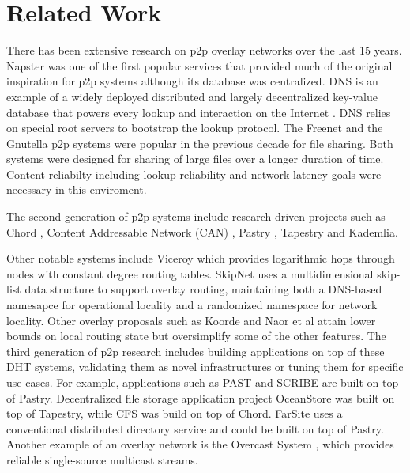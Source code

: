 \documentclass[journal]{IEEEtran}
\begin{document}
 

\section{Related Work}
\label{sec:rel}
There has been extensive research on p2p overlay networks over the last 15 years.  Napster \cite{Napster} was one of the first popular services that provided much of the original inspiration for p2p
systems although its database was centralized.  DNS is an example of a widely deployed distributed and largely
decentralized key-value database that powers every lookup and interaction on the Internet \cite{Mockapetris_1988}. DNS
relies on special root servers to bootstrap the lookup protocol. The Freenet \cite{freenet_thesis, Clarke_2001} and the
Gnutella \cite{Gnutella} p2p systems were popular in the previous decade for file sharing. Both systems were designed
for sharing of large files over a longer duration of time. Content reliabilty including lookup reliability and network
latency goals were necessary in this enviroment. 

The second generation of p2p systems include research driven projects such as Chord \cite{Stoica_2001}, Content
Addressable Network (CAN)
\cite{Ratnasamy_2001}, Pastry \cite{Rowstron_2001}, Tapestry \cite{tapestry2004} and
Kademlia. 

Other notable systems include Viceroy \cite{viceroy} which provides logarithmic hops through nodes with constant degree
routing tables. SkipNet \cite{skipnet} uses a multidimensional skip-list data structure to support overlay routing,
maintaining both a DNS-based namesapce for operational locality and a randomized namespace for network locality. Other
overlay proposals such as Koorde \cite{koorde} and Naor et al \cite{simple_hash} attain lower bounds on local routing
state but oversimplify some of the other features. 
\newline\newline
The third generation of p2p research includes building applications on top of these DHT systems, validating them as
novel infrastructures or tuning them for specific use cases. For example, applications such as PAST \cite{past} and
SCRIBE \cite{scribe} are built on top of Pastry. Decentralized file storage application project OceanStore \cite{oceanstore} was built
on top of Tapestry, while CFS \cite{cfs} was build on top of Chord. FarSite \cite{farsite} uses a conventional
distributed directory service and could be built on top of Pastry. Another example of an overlay network is the Overcast
System \cite{overcast}, which provides reliable single-source multicast streams.
\end{document}
